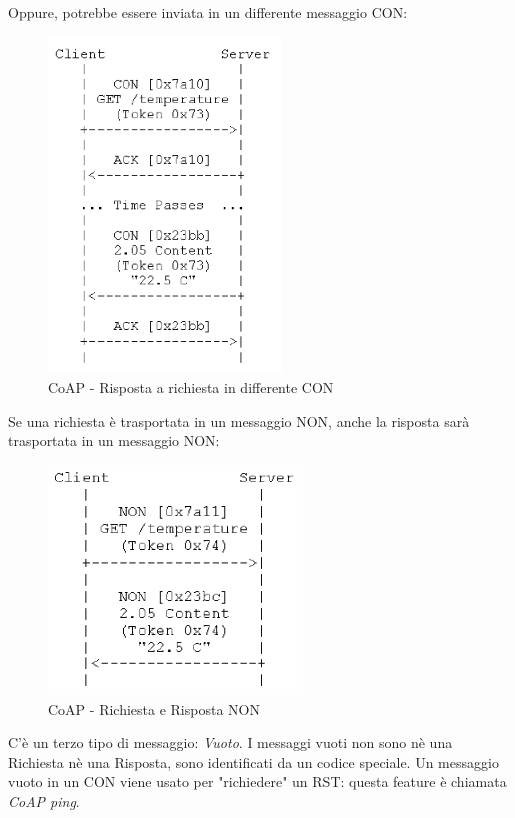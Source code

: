 \documentclass{article}
\begin{document}
Oppure, potrebbe essere inviata in un differente messaggio CON:
\begin{figure}[H]
\centering
\includegraphics[scale=0.6]{figures/coap risposta con.png}
\caption{CoAP - Risposta a richiesta in differente CON}
\end{figure}
Se una richiesta è trasportata in un messaggio NON, anche la risposta sarà trasportata in un messaggio NON:
\begin{figure}[H]
\centering
\includegraphics[scale=0.6]{figures/coap richiesta non.png}
\caption{CoAP - Richiesta e Risposta NON}
\end{figure}
C'è un terzo tipo di messaggio: \textit{Vuoto}. I messaggi vuoti non sono nè una Richiesta nè una Risposta, sono identificati da un codice speciale. Un messaggio vuoto in un CON viene usato per "richiedere" un RST: questa feature è chiamata \textit{CoAP ping}. 
\end{document}

